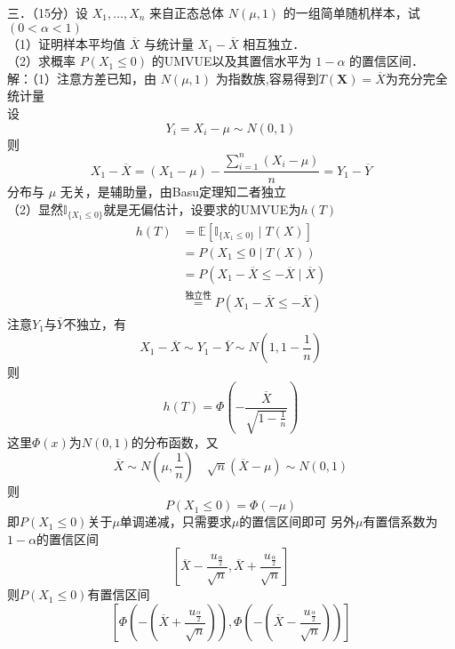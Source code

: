 \documentclass[UTF8,openany]{book}
\begin{document}
	
	\noindent 三．（15分）设 $X_1, \ldots, X_n$ 来自正态总体 $N(\mu, 1)$ 的一组简单随机样本，试 $(0<\alpha<1)$\\
	（1）证明样本平均值 $\overline{X}$ 与统计量 $X_1-\overline{X}$ 相互独立．\\
	（2）求概率 $P\left(X_1 \leq 0\right)$ 的UMVUE以及其置信水平为 $1-\alpha$ 的置信区间．\\
	解：（1）注意方差已知，由 $N(\mu,1)$ 为指数族,容易得到$T(\boldsymbol{X})=\overline{X}$为充分完全统计量\\
	设 
	$$Y_i=X_i-\mu \sim N(0,1)$$
	则 $$X_1-\overline{X}=\left(X_1-\mu\right)-\frac{\sum\limits_{i=1}^n \left(X_i-\mu\right)}{n}=Y_1-\overline{Y}$$
	分布与 $\mu$ 无关，是辅助量，由Basu定理知二者独立\\
	（2）显然$\mathbb{I}_{\{X_1\le 0\}}$就是无偏估计，设要求的UMVUE为$h(T)$
	\[
	\begin{aligned}
		h(T) & =\mathbb{E}\left[\mathbb{I}_{\{X_1\le 0\}} \mid T(X)\right] \\
		& =P\left(X_1 \leqslant 0 \mid T(X)\right) \\
		&=P\left(X_1-\overline{X} \leqslant -\overline{X} \mid \overline{X}\right) \\
		&\stackrel{\text{独立性}}{=} P\left(X_1-\overline{X} \leqslant-\overline{X}\right) 
	\end{aligned}
	\]
	注意$Y_1$与$\overline{Y}$不独立，有
	$$X_1-\overline{X}\sim Y_1-\overline{Y}\sim N\left(1,1-\frac{1}{n} \right) $$
	则
	\[
	h(T)=\Phi\left(-\frac{\overline{X}}{\sqrt{1-\frac{1}{n}}} \right) 
	\]
	这里$\Phi(x)$为$N(0,1)$的分布函数，又
	\[
	\overline{X} \sim N\left(\mu, \frac{1}{n}\right) \quad \sqrt{n}(\overline{X}-\mu) \sim N(0,1) 
	\]
	则
	\[
	P(X_1\le 0)=\Phi(-\mu)
	\]
	即$P(X_1\le 0)$关于$\mu$单调递减，只需要求$\mu$的置信区间即可
	另外$\mu$有置信系数为$1-\alpha$的置信区间
	\[
	\left[\overline{X}-\frac{u_{\frac{\alpha}{2}}}{\sqrt{n}},\overline{X}+\frac{u_{\frac{\alpha}{2}}}{\sqrt{n}} \right] 
	\]
	则$P(X_1\le 0)$有置信区间
	\[
	\left[\Phi\left(-\left(\overline{X}+\frac{u_{\frac{\alpha}{2}}}{\sqrt{n}}\right)\right), \Phi\left(-\left(\overline{X}-\frac{u_{\frac{\alpha}{2}}}{\sqrt{n}}\right)\right)\right]
	\]\\
	
	
	
\end{document}
